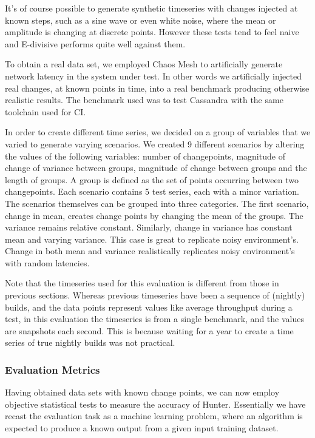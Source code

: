 \documentclass[sigconf]{acmart}
\begin{document}
It's of course possible to generate synthetic timeseries with changes injected at known steps, such
as a sine wave or even white noise, where the mean or amplitude is changing at discrete points.
However these tests tend to feel naive and E-divisive performs quite well against them.

To obtain a real data set, we employed Chaos Mesh\cite{CHAOS} to artificially generate network latency in the system
under test. In other words we artificially injected real changes, at known points in time, into a real
benchmark producing otherwise realistic results. The benchmark used was to test Cassandra with the 
same toolchain used for CI\cite{FALLOUT}.

In order to create different time series, we decided on a group of variables that we varied to
generate varying scenarios. We created 9 different scenarios by altering the values of the following
variables: number of changepoints, magnitude of change of variance between groups, magnitude of change
between groups and the length of groups. A group is defined as the set of points occurring between
two changepoints. Each scenario contains 5 test series, each with a minor variation. The scenarios
themselves can be grouped into three categories. The first scenario, change in mean, creates change
points by changing the mean of the groups. The variance remains relative constant. Similarly,
change in variance has constant mean and varying variance. This case is great to replicate noisy
environment's. Change in both mean and variance realistically replicates noisy environment's with random
latencies. 

Note that the timeseries used for this evaluation is different from those in previous sections.
Whereas previous timeseries have been a sequence of (nightly) builds, and the data points represent
values like average throughput during a test, in this evaluation the timeseries is from a single
benchmark, and the values are snapshots each second. This is because waiting for a year to create a
time series of true nightly builds was not practical.

\subsubsection{Evaluation Metrics}

Having obtained data sets with known change points, we can now employ objective statistical tests
to measure the accuracy of Hunter. Essentially we have recast the evaluation task as a machine
learning problem, where an algorithm is expected to produce a known output from a given input training
dataset.
\end{document}
